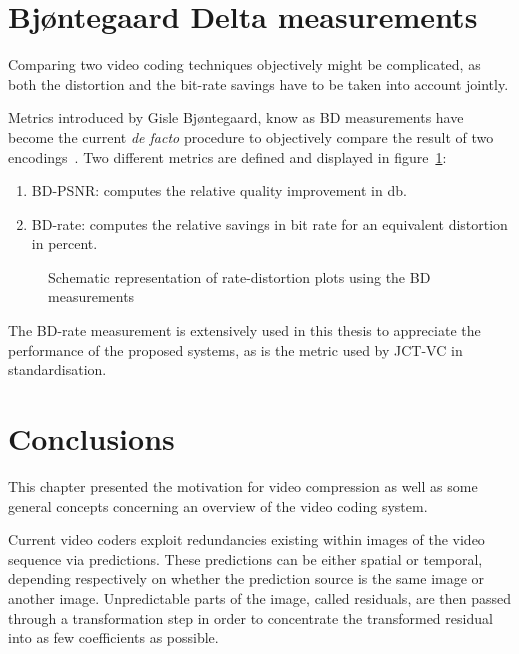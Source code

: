 \documentclass[11pt,a4paper,openright,twoside]{book}
\numberwithin{equation}{section} %
\numberwithin{figure}{section} %
\numberwithin{table}{section} %
\begin{document}
\section{Bj{\o}ntegaard Delta measurements}
\label{sub:bjontegaard_delta_measurements}

Comparing two video coding techniques objectively might be complicated,
as both the distortion and the bit-rate savings have to be taken into account
jointly.

Metrics introduced by Gisle Bjøntegaard, know as \ac{BD} measurements have
become the current \emph{de facto} procedure to objectively compare the result
of two encodings~\cite{VCEG-M33,VCEG-AI11}.
Two different metrics are defined and displayed in
figure~\ref{fig:bdsnr_bdrate}:
\begin{enumerate}[label = (\alph{enumi})]
	\item \ac{BD}-\ac{PSNR}: computes the relative quality improvement
		in \si{\decibel}.
	\item \ac{BD}-rate: computes the relative savings in bit rate for an
		equivalent distortion in percent.
\end{enumerate}

\begin{figure}[tb]
	\centering
	\hfill
	\caption{Schematic representation of rate-distortion plots using the
	\acs{BD} measurements}
	\label{fig:bdsnr_bdrate}
\end{figure}

The \ac{BD}-rate measurement is extensively used in this thesis to
appreciate the performance of the proposed systems, as is the metric used by
\acs{JCT-VC} in standardisation.

\section{Conclusions}
\label{sec:conclusions_video_coding}

This chapter presented the motivation for video compression as well as some
general concepts concerning an overview of the video coding system.

Current video coders exploit redundancies existing within images of the video
sequence via predictions.
These predictions can be either spatial or temporal, depending respectively on
whether the prediction source is the same image or another image.
Unpredictable parts of the image, called residuals, are then passed through a
transformation step in order to concentrate the transformed residual into as
few coefficients as possible.
\end{document}
